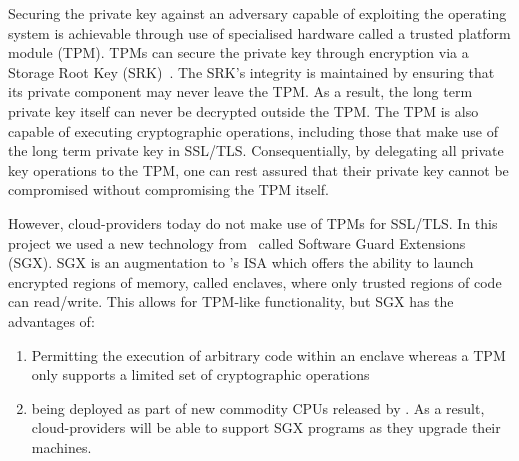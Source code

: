 \documentclass[../main.tex]{subfiles}
\begin{document}
Securing the private key against an adversary capable of exploiting
the operating system is achievable through use of specialised hardware
called a trusted platform module (TPM). TPMs can secure the private
key through encryption via a Storage Root Key (SRK)~\cite{tpm10}. The
SRK's integrity is maintained by ensuring that its private component
may never leave the TPM. As a result, the long term private key itself
can never be decrypted outside the TPM. The TPM is also capable of
executing cryptographic operations, including those that make use of
the long term private key in SSL/TLS. Consequentially, by delegating
all private key operations to the TPM, one can rest assured that their
private key cannot be compromised without compromising the TPM itself.

However, cloud-providers today do not make use of TPMs for SSL/TLS. In
this project we used a new technology from \Intel~called Software
Guard Extensions (SGX). SGX is an augmentation to \Intel's ISA which
offers the ability to launch encrypted regions of memory, called
enclaves, where only trusted regions of code can read/write. This
allows for TPM-like functionality, but SGX has the advantages of:
\begin{enumerate}
  \item Permitting the execution of arbitrary code within an enclave whereas a
    TPM only supports a limited set of cryptographic operations
  \item being deployed as part of new commodity CPUs released by \Intel.
    As a result, cloud-providers will be able to support SGX programs
    as they upgrade their machines.
\end{enumerate}

\end{document}
